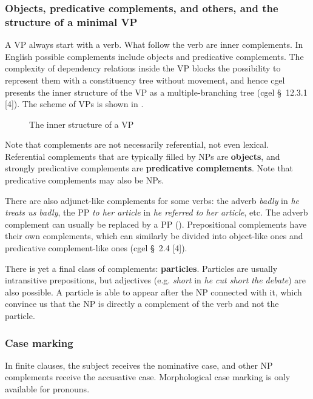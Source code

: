 \documentclass{article}
\newcommand*{\citesec}[1]{\S~{#1}}
\newcommand*{\concept}[1]{\textbf{#1}}
\newcommand*{\corpus}[1]{\emph{#1}}
\begin{document}
\subsubsection{Objects, predicative complements, and others, and the structure of a minimal VP}

A VP always start with a verb. What follow the verb are inner complements.
In English possible complements include objects and predicative complements.
The complexity of dependency relations inside the VP blocks the possibility 
to represent them with a constituency tree without movement,
and hence \ac{cgel} presents the inner structure of the VP 
as a multiple-branching tree (\ac{cgel} \citesec{12.3.1} [4]).
The scheme of VPs is shown in .

\begin{figure}
    \centering
    
    \caption{The inner structure of a VP}
    \label{fig:verb-phrase}
\end{figure}

Note that complements are not necessarily referential, not even lexical.
Referential complements that are typically filled by NPs are \concept{objects},
and strongly predicative complements are \concept{predicative complements}.
Note that predicative complements may also be NPs.

There are also adjunct-like complements for some verbs:
the adverb \corpus{badly} in \corpus{he treats us badly},
the PP \corpus{to her article} in \corpus{he referred to her article}, etc.
The adverb complement can usually be replaced by a PP ().
Prepositional complements have their own complements, 
which can similarly be divided into object-like ones 
and predicative complement-like ones 
(\ac{cgel} \citesec{2.4} [4]).

There is yet a final class of complements: \concept{particles}.
Particles are usually intransitive prepositions, but adjectives 
(e.g. \corpus{short} in \corpus{he cut short the debate})
are also possible.
A particle is able to appear after the NP connected with it, 
which convince us that the NP is directly a complement of the verb and not the particle.

\subsubsection{Case marking}

In finite clauses, the subject receives the nominative case, 
and other NP complements receive the accusative case.
Morphological case marking is only available for pronouns.
\end{document}
